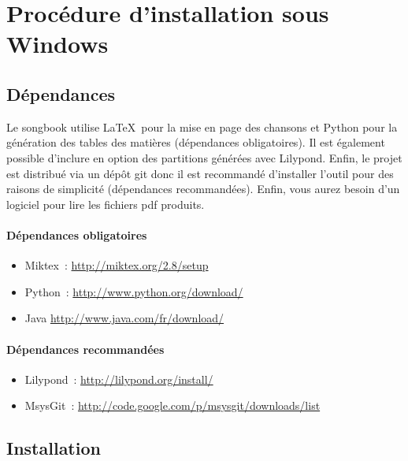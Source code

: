 \documentclass[online]{patacrep}
\begin{document}
\section{Procédure d'installation sous Windows}

\subsection{Dépendances}
\label{sec:songbook-dep-win}

Le songbook utilise \LaTeX\, pour la mise en page des chansons et
Python pour la génération des tables des matières (dépendances
obligatoires).  Il est également possible d'inclure en option des
partitions générées avec Lilypond. Enfin, le projet est distribué via
un dépôt git donc il est recommandé d'installer l'outil pour des
raisons de simplicité (dépendances recommandées). Enfin, vous aurez
besoin d'un logiciel pour lire les fichiers pdf produits.

\paragraph{Dépendances obligatoires}
\begin{itemize}
\item Miktex~: \url{http://miktex.org/2.8/setup}
\item Python~: \url{http://www.python.org/download/}
\item Java \url{http://www.java.com/fr/download/}
\end{itemize}

\paragraph{Dépendances recommandées}
\begin{itemize} 
\item Lilypond~: \url{http://lilypond.org/install/}
\item MsysGit~: \url{http://code.google.com/p/msysgit/downloads/list}
\end{itemize}

\subsection{Installation}
\label{sec:install-win}
\end{document}

